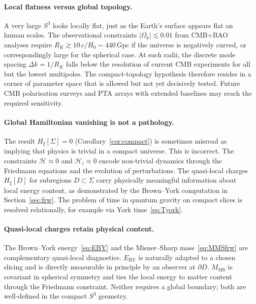 \documentclass[12pt,a4paper]{article}
\newcommand{\Sig}{\Sigma}           %
\newcommand{\pa}{\partial}          %
\newcommand{\Hxi}{H_\xi}
\newcommand{\RK}{R_K}
\newcommand{\EBY}{E_{\mathrm{BY}}}
\newcommand{\MMS}{M_{\mathrm{MS}}}
\newcommand{\onshell}{\approx}
\begin{document}
\paragraph{Local flatness versus global topology.}
A very large $S^3$ looks locally flat, just as the Earth's
surface appears flat on human scales. The observational
constraints $|\Omega_k|\lesssim 0.01$ from CMB+BAO analyses
require $\RK \gtrsim 10\,c/H_0 \sim 440\,\mathrm{Gpc}$
if the universe is negatively curved, or correspondingly
large for the spherical case. At such radii, the discrete
mode spacing $\Delta k = 1/\RK$ falls below the resolution
of current CMB experiments for all but the lowest
multipoles. The compact-topology hypothesis therefore
resides in a corner of parameter space that is allowed
but not yet decisively tested. Future CMB polarisation
surveys and PTA arrays with extended baselines may reach
the required sensitivity.

\paragraph{Global Hamiltonian vanishing is not a pathology.}
The result $\Hxi[\Sig] = 0$ (Corollary~\ref{cor:compact})
is sometimes misread as implying that physics is trivial
in a compact universe. This is incorrect. The constraints
$\mathcal{H}\onshell 0$ and $\mathcal{H}_i\onshell 0$
encode non-trivial dynamics through the Friedmann equations
and the evolution of perturbations. The quasi-local charges
$\Hxi[D]$ for subregions $D\subset\Sig$ carry physically
meaningful information about local energy content, as
demonstrated by the Brown--York computation in
Section~\ref{sec:frw}. The problem of time in quantum
gravity on compact slices is resolved relationally, for
example via York time~\eqref{eq:Tyork}.

\paragraph{Quasi-local charges retain physical content.}
The Brown--York energy~\eqref{eq:EBY} and the
Misner--Sharp mass~\eqref{eq:MMSfrw} are complementary
quasi-local diagnostics. $\EBY$ is naturally adapted to
a chosen slicing and is directly measurable in principle
by an observer at $\pa D$. $\MMS$ is covariant in
spherical symmetry and ties the local energy to matter
content through the Friedmann constraint. Neither requires
a global boundary; both are well-defined in the compact
$S^3$ geometry.
\end{document}
